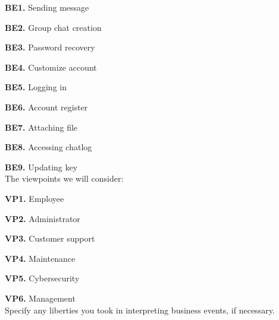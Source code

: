 \documentclass[]{article}
\begin{document}
\textbf{BE1.} Sending message

\textbf{BE2.} Group chat creation

\textbf{BE3.} Password recovery

\textbf{BE4.} Customize account

\textbf{BE5.} Logging in

\textbf{BE6.} Account register

\textbf{BE7.} Attaching file

\textbf{BE8.} Accessing chatlog

\textbf{BE9.} Updating key\\

\noindent The viewpoints we will consider:

\textbf{VP1.} Employee

\textbf{VP2.} Administrator

\textbf{VP3.} Customer support

\textbf{VP4.} Maintenance

\textbf{VP5.} Cybersecurity

\textbf{VP6.} Management\\

 Specify any liberties you took in interpreting business events, if necessary.\\
\end{document}
